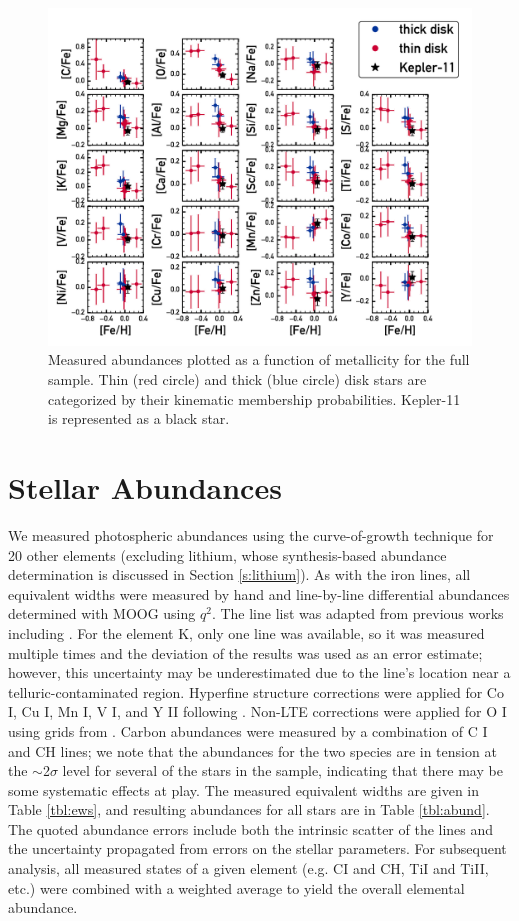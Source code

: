 \documentclass[twocolumn,trackchanges]{aastex61}
\begin{document}
\begin{figure}
\centering
\includegraphics[scale=0.7]{xh}
\caption{Measured abundances plotted as a function of metallicity for the full sample. Thin (red circle) and thick (blue circle) disk stars are categorized by their kinematic membership probabilities. Kepler-11 is represented as a black star.}
\label{fig:xh}
\end{figure}

\section{Stellar Abundances}
\label{s:abundances}

We measured photospheric abundances using the curve-of-growth technique for 20 other elements (excluding lithium, whose synthesis-based abundance determination is discussed in Section \ref{s:lithium}). As with the iron lines, all equivalent widths were measured by hand and line-by-line differential abundances determined with MOOG using $q^2$. The line list was adapted from previous works including \citet{Bedell2014}. For the element K, only one line was available, so it was measured multiple times and the deviation of the results was used as an error estimate; however, this uncertainty may be underestimated due to the line's location near a telluric-contaminated region. Hyperfine structure corrections were applied for Co I, Cu I, Mn I, V I, and Y II following \citet{Melendez2012}. Non-LTE corrections were applied for O I using grids from . Carbon abundances were measured by a combination of C I and CH lines; we note that the abundances for the two species are in tension at the $\sim$2$\sigma$ level for several of the stars in the sample, indicating that there may be some systematic effects at play. The measured equivalent widths are given in Table \ref{tbl:ews}, and resulting abundances for all stars are in Table \ref{tbl:abund}.  The quoted abundance errors include both the intrinsic scatter of the lines and the uncertainty propagated from errors on the stellar parameters. For subsequent analysis, all measured states of a given element (e.g. CI and CH, TiI and TiII, etc.) were combined with a weighted average to yield the overall elemental abundance.
\end{document}
